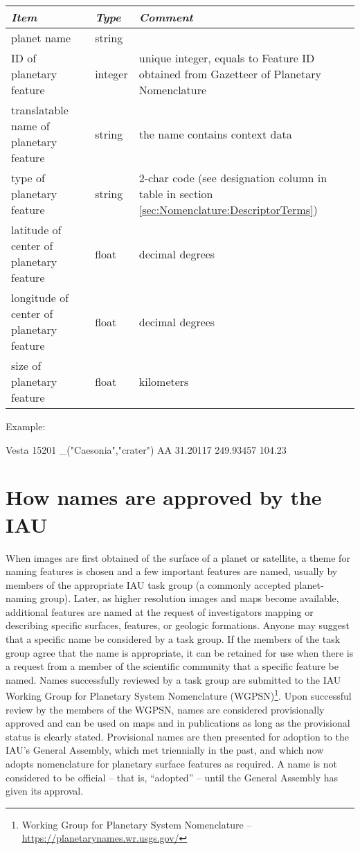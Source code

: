 \begin{longtabu} to \textwidth {l|l|X}\toprule
\emph{Item}        & \emph{Type} & \emph{Comment}\\\midrule
planet name           & string  & \\\midrule
ID of planetary feature & integer & unique integer, equals to Feature ID obtained from Gazetteer of Planetary Nomenclature\\\midrule
translatable name of planetary feature  & string  & the name contains context data\\\midrule
type of planetary feature  & string  & 2-char code (see designation column in table in section \ref{sec:Nomenclature:DescriptorTerms})\\\midrule
latitude of center of planetary feature & float  & decimal degrees\\\midrule
longitude of center of planetary feature & float  & decimal degrees\\\midrule
size of planetary feature & float & kilometers\\\bottomrule
\end{longtabu}

Example:
\begin{configfile}
Vesta 15201 _("Caesonia","crater") AA 31.20117 249.93457 104.23
\end{configfile}

\section{How names are approved by the IAU}
\label{sec:Nomenclature:ApprovingNames}
When images are first obtained of the surface of a planet or satellite, a theme for naming features is chosen and a few important features are named, usually by members of the appropriate IAU task group (a commonly accepted planet-naming group). Later, as higher resolution images and maps become available, additional features are named at the request of investigators mapping or describing specific surfaces, features, or geologic formations. Anyone may suggest that a specific name be considered by a task group. If the members of the task group agree that the name is appropriate, it can be retained for use when there is a request from a member of the scientific community that a specific feature be named. Names successfully reviewed by a task group are submitted to the IAU Working Group for Planetary System Nomenclature (WGPSN)\footnote{Working Group for Planetary System Nomenclature -- \url{https://planetarynames.wr.usgs.gov/}}. Upon successful review by the members of the WGPSN, names are considered provisionally approved and can be used on maps and in publications as long as the provisional status is clearly stated. Provisional names are then presented for adoption to the IAU's General Assembly, which met triennially in the past, and which now adopts nomenclature for planetary surface features as required. A name is not considered to be official -- that is, ``adopted'' -- until the General Assembly has given its approval.

